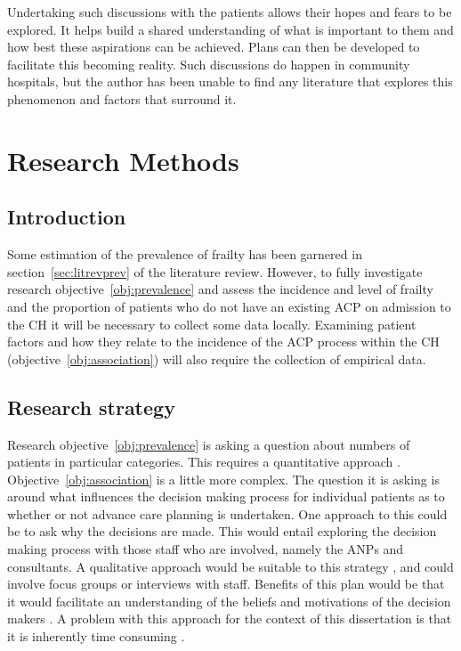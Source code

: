 \documentclass
[
	12pt,
	a4paper,
	oneside,
]{report}
\begin{document}
Undertaking such discussions with the patients allows their hopes and fears to
be explored. It helps build a shared understanding of what is important to
them and how best these aspirations can be achieved. Plans can then be 
developed to facilitate this becoming reality. Such discussions do happen in
community hospitals, but the author has been unable to find any literature
that explores this phenomenon and factors that surround it.

\chapter{Research Methods}
 
\section{Introduction}

Some estimation of the prevalence of frailty has been garnered in 
section~\ref{sec:litrevprev} of the literature review. However, to fully
investigate research objective~\ref{obj:prevalence} and assess the incidence
and level of frailty and the proportion of patients who do not have an
existing ACP on admission to the CH it will be necessary to collect some
data locally. Examining patient factors and how they relate to the incidence of
the ACP process within the CH (objective~\ref{obj:association}) will
also require the collection of empirical data.

\section{Research strategy}

Research objective~\ref{obj:prevalence} is asking a question about numbers
of patients in particular categories. This requires a quantitative approach
\parencite{biggam:15}.
Objective~\ref{obj:association} is a little more complex. The question it is 
asking is around what influences the decision making process for individual
patients as to whether or not advance care planning is undertaken. One 
approach to this could be to ask why the decisions are made. This would 
entail exploring the decision making process with those staff who are 
involved, namely the ANPs and consultants. A qualitative approach would
be suitable to this strategy \parencite{jolley:13}, and could involve 
focus groups or interviews with staff. Benefits of this plan would be that it 
would facilitate an understanding of the beliefs and motivations of the 
decision makers \parencite{parahoo:14}. A problem with this approach for the
context of this dissertation is that it is inherently time consuming
\parencite{jolley:13}.
\end{document}
